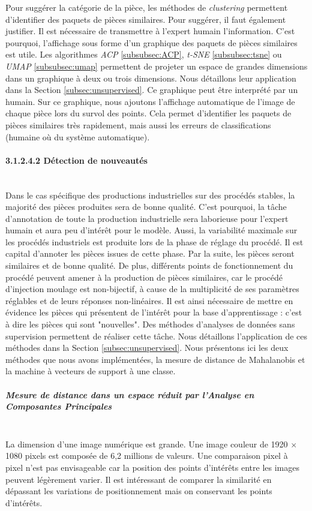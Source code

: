 Pour suggérer la catégorie de la pièce, les méthodes de \textit{clustering} permettent d'identifier des paquets de pièces similaires.
Pour suggérer, il faut également justifier.
Il est nécessaire de transmettre à l'expert humain l'information.
C'est pourquoi, l'affichage sous forme d'un graphique des paquets de pièces similaires est utile.
Les algorithmes \textit{ACP} \ref{subsubsec:ACP}, \textit{t-SNE} \ref{subsubsec:tsne} ou \textit{UMAP} \ref{subsubsec:umap} permettent de projeter un espace de grandes dimensions dans un graphique à deux ou trois dimensions.
Nous détaillons leur application dans la Section \ref{subsec:unsupervised}.
Ce graphique peut être interprété par un humain.
Sur ce graphique, nous ajoutons l'affichage automatique de l'image de chaque pièce lors du survol des points.
Cela permet d'identifier les paquets de pièces similaires très rapidement, mais aussi les erreurs de classifications (humaine où du système automatique).


\paragraph{3.1.2.4.2 Détection de nouveautés}\mbox{} \\
Dans le cas spécifique des productions industrielles sur des procédés stables, la majorité des pièces produites sera de bonne qualité.
C'est pourquoi, la tâche d'annotation de toute la production industrielle sera laborieuse pour l'expert humain et aura peu d'intérêt pour le modèle.
Aussi, la variabilité maximale sur les procédés industriels est produite lors de la phase de réglage du procédé.
Il est capital d'annoter les pièces issues de cette phase.
Par la suite, les pièces seront similaires et de bonne qualité.
De plus, différents points de fonctionnement du procédé peuvent amener à la production de pièces similaires, car le procédé d'injection moulage est non-bijectif, à cause de la multiplicité de ses paramètres réglables et de leurs réponses non-linéaires.
Il est ainsi nécessaire de mettre en évidence les pièces qui présentent de l'intérêt pour la base d'apprentissage : c'est à dire les pièces qui sont "nouvelles".
Des méthodes d'analyses de données sans supervision permettent de réaliser cette tâche.
Nous détaillons l'application de ces méthodes dans la Section \ref{subsec:unsupervised}.
Nous présentons ici les deux méthodes que nous avons implémentées, la mesure de distance de Mahalanobis et la machine à vecteurs de support à une classe.

\subparagraph{Mesure de distance dans un espace réduit par l'Analyse en Composantes Principales}\mbox{} \\
La dimension d'une image numérique est grande.
Une image couleur de 1920 $\times$ 1080 pixels est composée de 6,2 millions de valeurs.
Une comparaison pixel à pixel n'est pas envisageable car la position des points d'intérêts entre les images peuvent légèrement varier.
Il est intéressant de comparer la similarité en dépassant les variations de positionnement mais on conservant les points d'intérêts.

